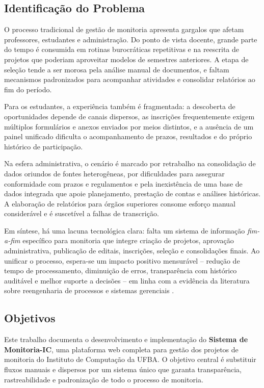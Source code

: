 \documentclass[portuguese]{sbc2025}%
\begin{document}
\subsection{Identificação do Problema}

O processo tradicional de gestão de monitoria apresenta gargalos que afetam professores, estudantes e administração. Do ponto de vista docente, grande parte do tempo é consumida em rotinas burocráticas repetitivas e na reescrita de projetos que poderiam aproveitar modelos de semestres anteriores. A etapa de seleção tende a ser morosa pela análise manual de documentos, e faltam mecanismos padronizados para acompanhar atividades e consolidar relatórios ao fim do período.

Para os estudantes, a experiência também é fragmentada: a descoberta de oportunidades depende de canais dispersos, as inscrições frequentemente exigem múltiplos formulários e anexos enviados por meios distintos, e a ausência de um painel unificado dificulta o acompanhamento de prazos, resultados e do próprio histórico de participação.

Na esfera administrativa, o cenário é marcado por retrabalho na consolidação de dados oriundos de fontes heterogêneas, por dificuldades para assegurar conformidade com prazos e regulamentos e pela inexistência de uma base de dados integrada que apoie planejamento, prestação de contas e análises históricas. A elaboração de relatórios para órgãos superiores consome esforço manual considerável e é suscetível a falhas de transcrição.

Em síntese, há uma lacuna tecnológica clara: falta um sistema de informação \textit{fim-a-fim} específico para monitoria que integre criação de projetos, aprovação administrativa, publicação de editais, inscrições, seleção e consolidações finais. Ao unificar o processo, espera-se um impacto positivo mensurável -- redução de tempo de processamento, diminuição de erros, transparência com histórico auditável e melhor suporte a decisões -- em linha com a evidência da literatura sobre reengenharia de processos e sistemas gerenciais \cite{Davenport1993, Hammer1993, Laudon_Laudon_2011}.

\subsection{Objetivos}

Este trabalho documenta o desenvolvimento e implementação do \textbf{Sistema de Monitoria-IC}, uma plataforma web completa para gestão dos projetos de monitoria do Instituto de Computação da UFBA. O objetivo central é substituir fluxos manuais e dispersos por um sistema único que garanta transparência, rastreabilidade e padronização de todo o processo de monitoria.
\end{document}
